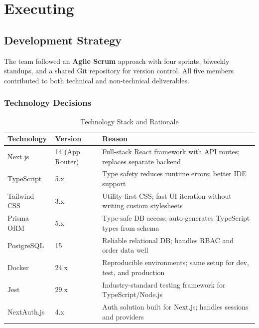 \documentclass[12pt,a4paper]{report}
\begin{document}
\chapter{Executing}

\section{Development Strategy}

The team followed an \textbf{Agile Scrum} approach with four sprints, biweekly standups, and a shared Git repository for version control. All five members contributed to both technical and non-technical deliverables.

\subsection{Technology Decisions}

\begin{table}[H]
  \centering
  \caption{Technology Stack and Rationale}
  \begin{tabularx}{\textwidth}{L{3cm} L{3cm} X}
    \toprule
    \textbf{Technology} & \textbf{Version} & \textbf{Reason} \\
    \midrule
    Next.js             & 14 (App Router) & Full-stack React framework with API routes; replaces separate backend \\
    TypeScript          & 5.x             & Type safety reduces runtime errors; better IDE support \\
    Tailwind CSS        & 3.x             & Utility-first CSS; fast UI iteration without writing custom stylesheets \\
    Prisma ORM          & 5.x             & Type-safe DB access; auto-generates TypeScript types from schema \\
    PostgreSQL          & 15              & Reliable relational DB; handles RBAC and order data well \\
    Docker              & 24.x            & Reproducible environments; same setup for dev, test, and production \\
    Jest                & 29.x            & Industry-standard testing framework for TypeScript/Node.js \\
    NextAuth.js         & 4.x             & Auth solution built for Next.js; handles sessions and providers \\
    \bottomrule
  \end{tabularx}
\end{table}
\end{document}
